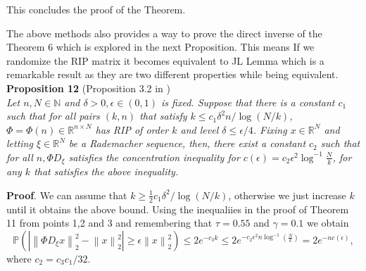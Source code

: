 \documentclass[twoside,11pt]{article}
\newcommand\norm[1]{\left\lVert#1\right\rVert}
\newcommand*\by{{\times}}
\begin{document}
This concludes the proof of the Theorem.

\hfill\BlackBox

The above methods also provides a way to prove the direct inverse of the Theorem 6 which is explored in the next Proposition. This means If we randomize the RIP matrix it becomes equivalent to JL Lemma which is a remarkable result as they are two different properties while being equivalent. \\

\noindent
{\bf Proposition 12} (Proposition 3.2 in \citep{Khramer}) \\
{\it
Let $n, N \in \mathbb{N}$ and $\delta > 0, \epsilon \in (0, 1)$ is fixed. Suppose that there is a constant $c_1$ such that for all pairs $(k, n)$ that satisfy $k \leq c_1 \delta^2 n/\log{(N/k)}$, $\Phi = \Phi(n) \in \mathbb{R}^{n \by N}$ has RIP of order $k$ and level $\delta \leq \epsilon/4$. Fixing $x \in \mathbb{R}^N$ and letting $\xi \in \mathbb{R}^N$ be a Rademacher sequence, then, there exist a constant $c_2$ such that for all $n, \Phi D_{\xi}$ satisfies the concentration inequality for $c(\epsilon) = c_2 \epsilon^2 \log^{-1}{\frac{N}{k}}$, for any $k$ that satisfies the above inequality.
}

\noindent
{\bf Proof}. We can assume that $k \geq \frac{1}{2} c_1 \delta^2/\log{(N/k)}$, otherwise we just increase $k$ until it obtains the above bound. Using the inequaliies in the proof of Theorem 11 from points 1,2 and 3 and remembering that $\tau = 0.55$ and $\gamma = 0.1$ we obtain 
$$
\mathbb{P}(|\norm{\Phi D_{\xi} x}_2^2 - \norm{x}_2^2| \geq \epsilon \norm{x}_2^2) \leq 2 e^{-c_3k} \leq 2e^{-c_2 \epsilon^2 n \log^{-1}{(\frac{N}{k})}} = 2e^{-n c(\epsilon)},
$$
where $c_2 = c_3c_1/32$.
\hfill\BlackBox

\newpage


\vskip 0.2in

\end{document}
